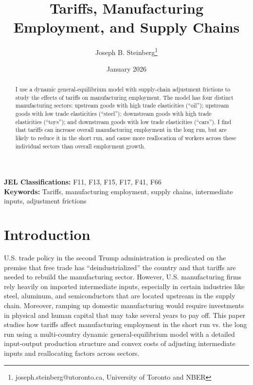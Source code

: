 \documentclass[12pt]{article}
\title{\vspace{-2cm}\textbf{Tariffs, Manufacturing Employment, and Supply Chains}}
\author{Joseph B. Steinberg\footnote{joseph.steinberg@utoronto.ca, University of Toronto and NBER} }
\date{January 2026}
\begin{document}
\setlength{\footnotesep}{0.1\baselineskip}
\setcounter{page}{0}

\maketitle
\vspace{-1cm}
\begin{abstract}
\vspace{-0.25cm}
\begin{singlespace}
\noindent
 I use a dynamic general-equilibrium model with supply-chain adjustment frictions to study the effects of tariffs on manufacturing employment. The model has four distinct manufacturing sectors: upstream goods with high trade elasticities (``oil''); upstream goods with low trade elasticities (``steel''); downstream goods with high trade elasticities (``toys''); and downstream goods with low trade elasticities (``cars''). I find that tariffs can increase overall manufacturing employment in the long run, but are likely to reduce it in the short run, and cause more reallocation of workers across these individual sectors than overall employment growth.
\end{singlespace}
\end{abstract}


\textbf{JEL Classifications:} F11, F13, F15, F17, F41, F66 \\
\indent\textbf{Keywords:} Tariffs, manufacturing employment, supply chains, intermediate inputs, adjustment frictions\\
\thispagestyle{empty}

\newpage

\section{Introduction}

U.S. trade policy in the second Trump administration is predicated on the premise that free trade has ``deindustrialized'' the country and that tariffs are needed to rebuild the manufacturing sector. However, U.S. manufacturing firms rely heavily on imported intermediate inputs, especially in certain industries like steel, aluminum, and semiconductors that are located upstream in the supply chain. Moreover, ramping up domestic manufacturing would require investments in physical and human capital that may take several years to pay off. This paper studies how tariffs affect manufacturing employment in the short run vs. the long run using a multi-country dynamic general-equilibrium model with a detailed input-output production structure and convex costs of adjusting intermediate inputs and reallocating factors across sectors.   
\end{document}
